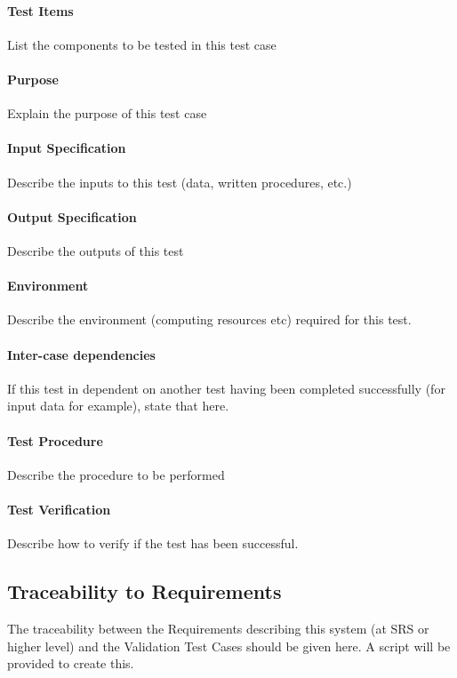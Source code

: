 \documentclass[CUx,lsstdraft,STP]{lsstdoc}
\begin{document}
\paragraph{Test Items}

List the components to be tested in this test case

\paragraph{Purpose}

Explain the purpose of this test case

\paragraph{Input Specification}

Describe the inputs to this test (data, written procedures, etc.)

\paragraph{Output Specification}

Describe the outputs of this test

\paragraph{Environment}

Describe the environment (computing resources etc) required for this test.

\paragraph{Inter-case dependencies}

If this test in dependent on another test having been completed successfully (for input data for example), state that here.

\paragraph{Test Procedure}

Describe the procedure to be performed

\paragraph{Test Verification}

Describe how to verify if the test has been successful.

\subsection{Traceability to Requirements}

The traceability between the Requirements describing this system (at SRS or higher level) and the Validation Test Cases should be given here. A script will be provided to create this.
\end{document}
